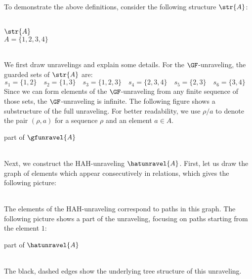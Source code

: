 \begin{example}
  \newlength\figindent\setlength\figindent{7em}%
  \newlength\figdist\setlength\figdist{2em}%
  To demonstrate the above definitions, consider the following structure $\str{A}$:\\[1ex]
  \begin{minipage}{\figindent}
    \raggedleft
    \\[0.7ex]
    {\Huge{$\str{A}$}}\\[0.5ex]
    {$A = \{1,2,3,4\}$}
  \end{minipage}
  \hspace{\figdist}
  \\

  \noindent
  We first draw unravelings and explain some details.
  For the $\GF$-unraveling, the guarded sets of $\str{A}$ are:
  \begin{equation*}
    s_{1} = \{1,2\}\quad
    s_{2} = \{1,3\}\quad
    s_{3} = \{1,2,3\}\quad
    s_{4} = \{2,3,4\}\quad
    s_{5} = \{2,3\}\quad
    s_{6} = \{3,4\}\quad
  \end{equation*}
  Since we can form elements of the $\GF$-unraveling from any finite sequence of those sets, the $\GF$-unraveling is infinite.
  The following figure shows a substructure of the full unraveling.
  For better readability, we use $\rho / a$ to denote the pair $(\rho, a)$ for a sequence $\rho$ and an element $a \in A$.\\[2ex]
  \begin{minipage}{\figindent}
    \raggedleft
    part of \Huge{$\gfunravel{A}$}
  \end{minipage}
  \hspace{\figdist}
  \\[1ex]

  \noindent
  Next, we construct the HAH-unraveling $\hatunravel{A}$. First, let us draw the graph of elements which appear consecutively in relations, which gives the following picture:\\[1ex]
  \begin{minipage}{\figindent}
    \mbox{}
  \end{minipage}
  \hspace{\figdist}
  \\[1ex]
  The elements of the HAH-unraveling correspond to paths in this graph.
  The following picture shows a part of the unraveling, focusing on paths starting from the element $1$:\\[1ex]
  \begin{minipage}{\figindent}
    \raggedleft
    part of \Huge{$\hatunravel{A}$}
  \end{minipage}
  \hspace{\figdist}
  \\[2ex]
  The black, dashed edges show the underlying tree structure of this unraveling.


\end{example}
